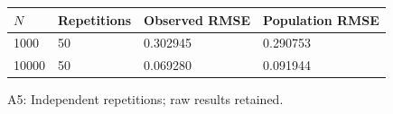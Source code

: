 \begin{center}
\small
\begin{tabular}{llll}
\toprule
$N$ & Repetitions & Observed RMSE & Population RMSE\\
\midrule
1000 & 50 & 0.302945 & 0.290753\\
10000 & 50 & 0.069280 & 0.091944\\
\bottomrule
\end{tabular}
\par\smallskip A5: Independent repetitions; raw results retained.
\end{center}